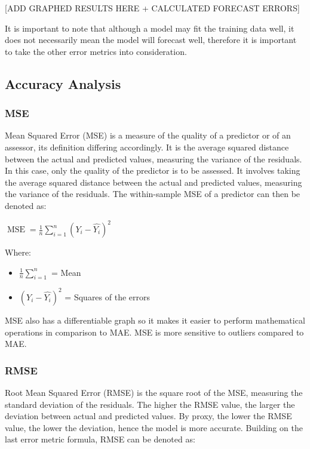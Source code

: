 \documentclass{mcmthesis}
\begin{document}
    [ADD GRAPHED RESULTS HERE + CALCULATED FORECAST ERRORS]

    It is important to note that although a model may fit the training data well, it does not necessarily mean the model will forecast well, therefore it is important to take the other error metrics into consideration.


    \subsection{Accuracy Analysis}

    \subsubsection{MSE}
    Mean Squared Error (MSE) is a measure of the quality of a predictor or of an assessor, its definition differing accordingly. It is the average squared distance between the actual and predicted values, measuring the variance of the residuals. In this case, only the quality of the predictor is to be assessed. It involves taking the average squared distance between the actual and predicted values, measuring the variance of the residuals. The within-sample MSE of a predictor can then be denoted as:

    ${\operatorname {MSE} ={\frac {1}{n}}\sum _{i=1}^{n}\left(Y_{i}-{\hat {Y_{i}}}\right)^{2}}$

    Where:
    \begin{itemize}
        \item ${\frac {1}{n}\sum _{i=1}^{n}}$ = Mean
        \item ${\left(Y_{i}-{\hat {Y_{i}}}\right)^{2}}$ = Squares of the errors
    \end{itemize}

     MSE also has a differentiable graph so it makes it easier to perform mathematical operations in comparison to MAE. MSE is more sensitive to outliers compared to MAE.

    \subsubsection{RMSE}
    Root Mean Squared Error (RMSE) is the square root of the MSE, measuring the standard deviation of the residuals. The higher the RMSE value, the larger the deviation between actual and predicted values. By proxy, the lower the RMSE value, the lower the deviation, hence the model is more accurate. Building on the last error metric formula, RMSE can be denoted as:
\end{document}

